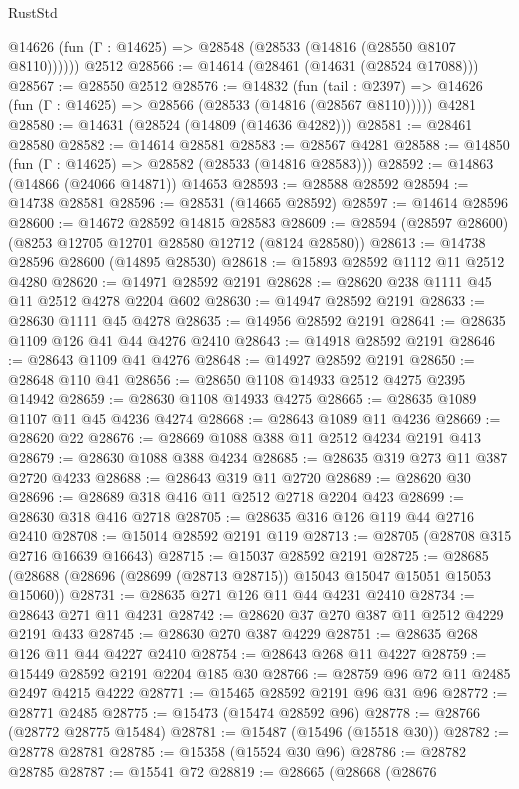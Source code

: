 \begin{lexlean}{RustStd}
\begin{coremodule}
      @14626 (fun (Γ : @14625) => @28548 (@28533 (@14816 (@28550 @8107 @8110))))))
    @2512
@28566 := @14614 (@28461 (@14631 (@28524 @17088)))
@28567 := @28550 @2512
@28576 := @14832
    (fun (tail : @2397) => @14626 (fun (Γ : @14625) => @28566 (@28533 (@14816 (@28567 @8110)))))
    @4281
@28580 := @14631 (@28524 (@14809 (@14636 @4282)))
@28581 := @28461 @28580
@28582 := @14614 @28581
@28583 := @28567 @4281
@28588 := @14850 (fun (Γ : @14625) => @28582 (@28533 (@14816 @28583)))
@28592 := @14863 (@14866 (@24066 @14871)) @14653
@28593 := @28588 @28592
@28594 := @14738 @28581
@28596 := @28531 (@14665 @28592)
@28597 := @14614 @28596
@28600 := @14672 @28592 @14815 @28583
@28609 := @28594 (@28597 @28600) (@8253 @12705 @12701 @28580 @12712 (@8124 @28580))
@28613 := @14738 @28596 @28600 (@14895 @28530)
@28618 := @15893 @28592 @1112 @11 @2512 @4280
@28620 := @14971 @28592 @2191
@28628 := @28620 @238 @1111 @45 @11 @2512 @4278 @2204 @602
@28630 := @14947 @28592 @2191
@28633 := @28630 @1111 @45 @4278
@28635 := @14956 @28592 @2191
@28641 := @28635 @1109 @126 @41 @44 @4276 @2410
@28643 := @14918 @28592 @2191
@28646 := @28643 @1109 @41 @4276
@28648 := @14927 @28592 @2191
@28650 := @28648 @110 @41
@28656 := @28650 @1108 @14933 @2512 @4275 @2395 @14942
@28659 := @28630 @1108 @14933 @4275
@28665 := @28635 @1089 @1107 @11 @45 @4236 @4274
@28668 := @28643 @1089 @11 @4236
@28669 := @28620 @22
@28676 := @28669 @1088 @388 @11 @2512 @4234 @2191 @413
@28679 := @28630 @1088 @388 @4234
@28685 := @28635 @319 @273 @11 @387 @2720 @4233
@28688 := @28643 @319 @11 @2720
@28689 := @28620 @30
@28696 := @28689 @318 @416 @11 @2512 @2718 @2204 @423
@28699 := @28630 @318 @416 @2718
@28705 := @28635 @316 @126 @119 @44 @2716 @2410
@28708 := @15014 @28592 @2191 @119
@28713 := @28705 (@28708 @315 @2716 @16639 @16643)
@28715 := @15037 @28592 @2191
@28725 := @28685 (@28688 (@28696 (@28699 (@28713 @28715)) @15043 @15047 @15051 @15053 @15060))
@28731 := @28635 @271 @126 @11 @44 @4231 @2410
@28734 := @28643 @271 @11 @4231
@28742 := @28620 @37 @270 @387 @11 @2512 @4229 @2191 @433
@28745 := @28630 @270 @387 @4229
@28751 := @28635 @268 @126 @11 @44 @4227 @2410
@28754 := @28643 @268 @11 @4227
@28759 := @15449 @28592 @2191 @2204 @185 @30
@28766 := @28759 @96 @72 @11 @2485 @2497 @4215 @4222
@28771 := @15465 @28592 @2191 @96 @31 @96
@28772 := @28771 @2485
@28775 := @15473 (@15474 @28592 @96)
@28778 := @28766 (@28772 @28775 @15484)
@28781 := @15487 (@15496 (@15518 @30))
@28782 := @28778 @28781
@28785 := @15358 (@15524 @30 @96)
@28786 := @28782 @28785
@28787 := @15541 @72
@28819 := @28665
    (@28668
      (@28676

\end{coremodule}
\end{lexlean}
